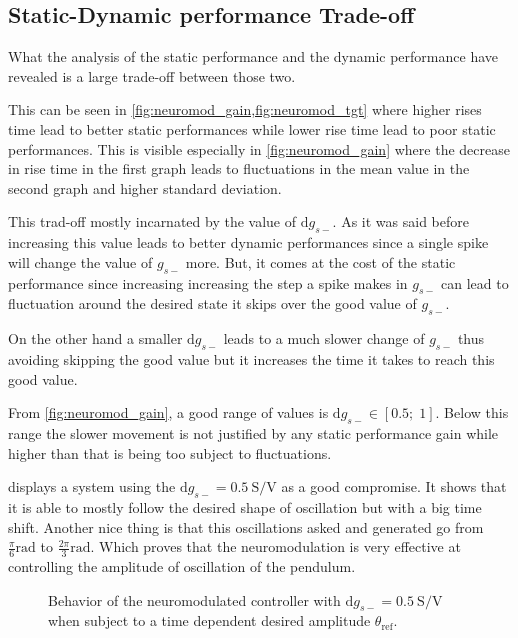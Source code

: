 \subsection{Static-Dynamic performance Trade-off}

What the analysis of the static performance and the dynamic performance have revealed is a large trade-off between those two.

This can be seen in \cref{fig:neuromod_gain,fig:neuromod_tgt} where higher rises time lead to better static performances while lower rise time lead to poor static performances. 
This is visible especially in \cref{fig:neuromod_gain} where the decrease in rise time in the first graph leads to fluctuations in the mean value in the second graph and higher standard deviation.

This trad-off mostly incarnated by the value of $\mathrm{d}g_{s-}$. 
As it was said before increasing this value leads to better dynamic performances since a single spike will change the value of $g_{s-}$ more. 
But, it comes at the cost of the static performance since increasing increasing the step a spike makes in $g_{s-}$ can lead to fluctuation around the desired state it skips over the good value of $g_{s-}$.

On the other hand a smaller $\mathrm{d}g_{s-}$ leads to a much slower change of $g_{s-}$ thus avoiding skipping the good value but it increases the time it takes to reach this good value.

From \cref{fig:neuromod_gain}, a good range of values is $\mathrm{d}g_{s-} \in \left[0.5;\;1\right]$.
Below this range the slower movement is not justified by any static performance gain while higher than that is being too subject to fluctuations.

 displays a system using the $\mathrm{d}g_{s-} = \qty{0.5}{\siemens\per\volt}$ as a good compromise. 
It shows that it is able to mostly follow the desired shape of oscillation but with a big time shift.
Another nice thing is that this oscillations asked and generated go from $\frac{\pi}{6}\unit{\radian}$ to  $\frac{2\pi}{3}\unit{\radian}$. Which proves that the neuromodulation is very effective at controlling the amplitude of oscillation of the pendulum.

\begin{figure}[!htbp]
    \centering
    \caption{Behavior of the neuromodulated controller with $\mathrm{d}g_{s-} = \qty{0.5}{\siemens\per\volt}$ when subject to a time dependent desired amplitude $\theta_\text{ref}$.}
    \label{fig:neuromod_change}
\end{figure}
